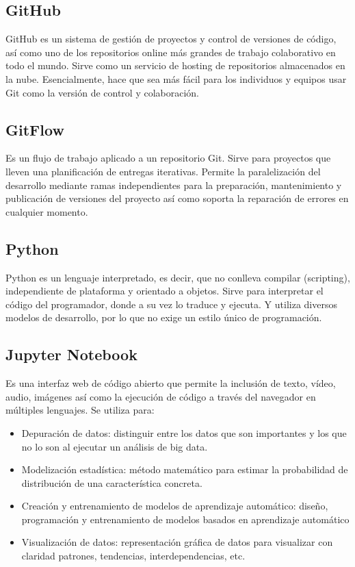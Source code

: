 \documentclass[12pt,letterpaper]{article}
\begin{document}
\subsection*{GitHub}
GitHub es un sistema de gesti\'on de proyectos y control de versiones de c\'odigo, as\'i como uno de los repositorios online m\'as grandes de trabajo colaborativo en todo el mundo.
\citep{HostGitHub}
Sirve como un servicio de hosting de repositorios almacenados en la nube. Esencialmente, hace que sea m\'as f\'acil para los individuos y equipos usar Git como la versi\'on de control y colaboraci\'on.
\citep{KinGitHub}

\subsection*{GitFlow}
Es un flujo de trabajo aplicado a un repositorio Git. 
Sirve para proyectos que lleven una planificaci\'on de entregas iterativas. Permite la paralelización del desarrollo mediante ramas independientes para la preparaci\'on, mantenimiento y publicaci\'on de versiones del proyecto as\'i como soporta la reparaci\'on de errores en cualquier momento.
\citep{ClaGit}

\subsection*{Python}
Python es un lenguaje interpretado, es decir, que no conlleva compilar (scripting), independiente de plataforma y orientado a objetos. 
\citep{DesPy}
Sirve para interpretar el c\'odigo del programador, donde a su vez lo traduce y ejecuta. Y utiliza diversos modelos de desarrollo, por lo que no exige un estilo \'unico de programaci\'on.
\citep{AnPy}


\subsection*{Jupyter Notebook}
Es una interfaz web de c\'odigo abierto que permite la inclusi\'on de texto, v\'ideo, audio, im\'agenes as\'i como la ejecuci\'on de c\'odigo a trav\'es del navegador en m\'ultiples lenguajes. 
\citep{CaDiaJupyter}
Se utiliza para: 
\begin{itemize}
\item Depuraci\'on de datos: distinguir entre los datos que son importantes y los que no lo son al ejecutar un an\'alisis de big data.
\item Modelizaci\'on estad\'istica: m\'etodo matem\'atico para estimar la probabilidad de distribuci\'on de una caracter\'istica concreta.
\item Creaci\'on y entrenamiento de modelos de aprendizaje autom\'atico: diseño, programaci\'on y entrenamiento de modelos basados en aprendizaje autom\'atico
\item Visualizaci\'on de datos: representaci\'on gr\'afica de datos para visualizar con claridad patrones, tendencias, interdependencias, etc.
\citep{DigJupyter}
\end{itemize}
\end{document}
